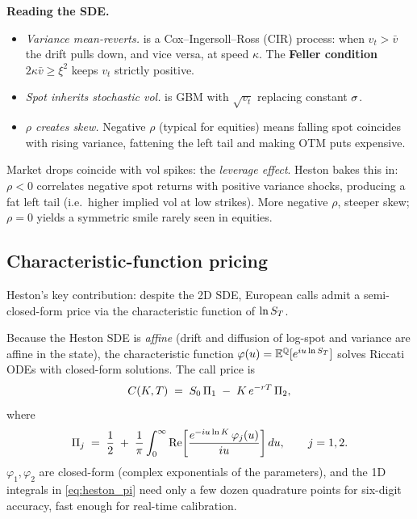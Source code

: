 \noindent
\textbf{Reading the SDE.}
\begin{itemize}
  \item \emph{Variance mean-reverts.}  is a
    Cox--Ingersoll--Ross (CIR) process: when $v_t > \bar v$ the drift
    pulls down, and vice versa, at speed $\kappa$. The
    \textbf{Feller condition} $2\kappa\bar v \geq \xi^2$ keeps $v_t$
    strictly positive.
  \item \emph{Spot inherits stochastic vol.} 
    is GBM with $\sqrt{v_t}$ replacing constant $\sigma$.
  \item \emph{$\rho$ creates skew.} Negative $\rho$ (typical for
    equities) means falling spot coincides with rising variance,
    fattening the left tail and making OTM puts expensive.
\end{itemize}

\begin{intuitionbox}[title={Why negative $\rho$ creates skew}]
\label{intuition:heston_rho}
Market drops coincide with vol spikes: the \emph{leverage effect}.
Heston bakes this in: $\rho<0$ correlates negative spot returns with
positive variance shocks, producing a fat left tail (i.e.\ higher
implied vol at low strikes). More negative $\rho$, steeper skew;
$\rho=0$ yields a symmetric smile rarely seen in equities.
\end{intuitionbox}

\subsection{Characteristic-function pricing}
\label{subsec:heston_cf}

Heston's key contribution: despite the 2D SDE, European calls admit a
semi-closed-form price via the characteristic function of $\ln S_T$.

Because the Heston SDE is \emph{affine} (drift and diffusion of
log-spot and variance are affine in the state), the characteristic
function $\varphi(u)=\mathbb{E}^{\mathbb{Q}}[e^{iu\ln S_T}]$ solves Riccati
ODEs with closed-form solutions. The call price is
\begin{equation}
  C(K, T)
  \;=\;
  S_0\,\Pi_1 \;-\; K\,e^{-r T}\,\Pi_2,
  \label{eq:heston_call}
\end{equation}
where
\begin{equation}
  \Pi_j
  \;=\;
  \frac{1}{2}
  \;+\;
  \frac{1}{\pi}\int_0^{\infty}
    \operatorname{Re}\!\left[
      \frac{e^{-iu\ln K}\,\varphi_j(u)}{iu}
    \right] du,
  \qquad j = 1, 2.
  \label{eq:heston_pi}
\end{equation}
$\varphi_1,\varphi_2$ are closed-form (complex exponentials of the
parameters), and the 1D integrals in \eqref{eq:heston_pi} need only a
few dozen quadrature points for six-digit accuracy, fast enough for
real-time calibration.

